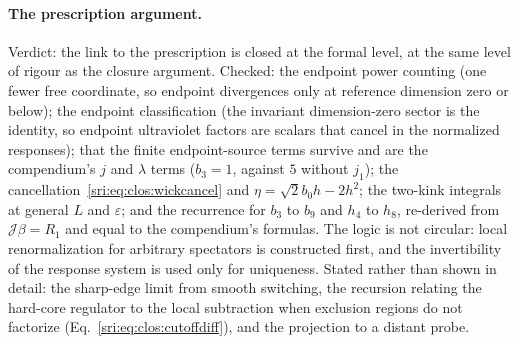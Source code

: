 \paragraph{The prescription argument.} Verdict: the link to the prescription is closed at the formal level, at the same
level of rigour as the closure argument. Checked: the endpoint power counting (one fewer free coordinate, so endpoint
divergences only at reference dimension zero or below); the endpoint classification (the invariant dimension-zero
sector is the identity, so endpoint ultraviolet factors are scalars that cancel in the normalized responses); that the
finite endpoint-source terms survive and are the compendium's $j$ and $\lambda$ terms ($b_3=1$, against $5$ without
$j_1$); the cancellation~\eqref{sri:eq:clos:wickcancel} and $\eta=\sqrt2b_0h-2h^2$; the two-kink integrals at general $L$
and $\varepsilon$; and the recurrence for $b_3$ to $b_9$ and $h_4$ to $h_8$, re-derived from $\mathcal J\beta=R_1$ and
equal to the compendium's formulas. The logic is not circular: local renormalization for arbitrary spectators is
constructed first, and the invertibility of the response system is used only for uniqueness. Stated rather than shown
in detail: the sharp-edge limit from smooth switching, the recursion relating the hard-core regulator to the local
subtraction when exclusion regions do not factorize (Eq.~\eqref{sri:eq:clos:cutoffdiff}), and the projection to a distant
probe.

